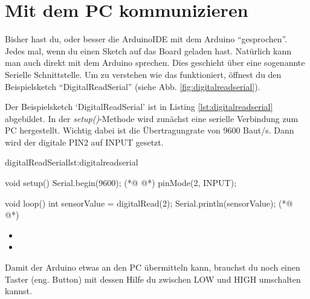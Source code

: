 \section{Mit dem PC kommunizieren}\label{sec:kommunikation}

Bisher hast du, oder besser die ArduinoIDE mit dem Arduino ``gesprochen''. Jedes mal, wenn du einen Sketch auf das Board geladen hast. Natürlich kann man auch direkt mit dem Arduino sprechen. Dies geschieht über eine sogenannte Serielle Schnittstelle. Um zu verstehen wie das funktioniert, öffnest du den Beispielsketch ``DigitalReadSerial'' (siehe Abb. \ref{fig:digitalreadserial}).


Der Beispielsketch `DigitalReadSerial' ist in Listing \ref{lst:digitalreadserial} abgebildet. In der \textit{setup()}-Methode
wird zunächst eine serielle Verbindung zum PC hergestellt. Wichtig dabei ist die Übertragungrate von 9600 Baut/s.
Dann wird der digitale PIN2 auf INPUT gesetzt.   
\begin{multicols}{2}
\begin{arduinoCode}{digitalReadSerial}{lst:digitalreadserial}

void setup() {
  Serial.begin(9600); (*@  @*) 
  pinMode(2, INPUT);
}

void loop() {
  int sensorValue = digitalRead(2);
  Serial.println(sensorValue); (*@  @*) 
}
\end{arduinoCode}
\vfill
\columnbreak

\null\vfill
\begin{itemize}
  \itemsep15pt
  \item[] 
  \item[] 
\end{itemize}
\vfill \null

\end{multicols}

Damit der Arduino etwas an den PC übermitteln kann, brauchst du noch einen Taster (eng. Button) mit dessen Hilfe du zwischen LOW und HIGH umschalten kannst.

